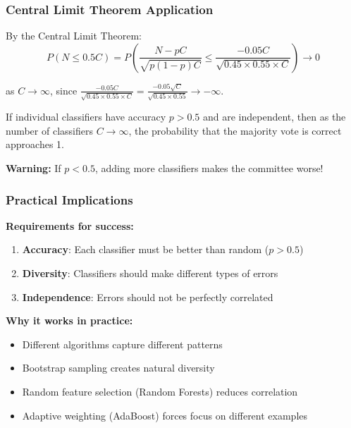 \documentclass[12pt,a4paper]{article}
\begin{document}
\subsubsection{Central Limit Theorem Application}

By the Central Limit Theorem:
\begin{equation}
P(N \leq 0.5C) = P\left(\frac{N - pC}{\sqrt{p(1-p)C}} \leq \frac{-0.05C}{\sqrt{0.45 \times 0.55 \times C}}\right) \to 0
\end{equation}

as $C \to \infty$, since $\frac{-0.05C}{\sqrt{0.45 \times 0.55 \times C}} = \frac{-0.05\sqrt{C}}{\sqrt{0.45 \times 0.55}} \to -\infty$.

\begin{tcolorbox}[colback=red!5!white,colframe=red!75!black,title=Condorcet's Theorem]
If individual classifiers have accuracy $p > 0.5$ and are independent, then as the number of classifiers $C \to \infty$, the probability that the majority vote is correct approaches 1.

\textbf{Warning:} If $p < 0.5$, adding more classifiers makes the committee worse!
\end{tcolorbox}

\subsubsection{Practical Implications}

\textbf{Requirements for success:}
\begin{enumerate}
    \item \textbf{Accuracy}: Each classifier must be better than random ($p > 0.5$)
    \item \textbf{Diversity}: Classifiers should make different types of errors
    \item \textbf{Independence}: Errors should not be perfectly correlated
\end{enumerate}

\textbf{Why it works in practice:}
\begin{itemize}
    \item Different algorithms capture different patterns
    \item Bootstrap sampling creates natural diversity
    \item Random feature selection (Random Forests) reduces correlation
    \item Adaptive weighting (AdaBoost) forces focus on different examples
\end{itemize}
\end{document}
